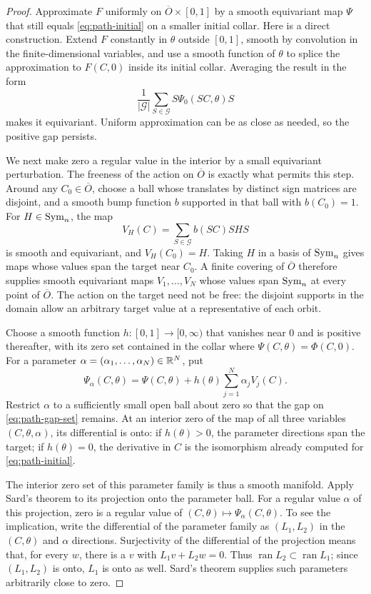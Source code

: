 \begin{proof}
Approximate $F$ uniformly on $\overline O\times[0,1]$ by a smooth
equivariant map $\Psi$ that still equals \eqref{eq:path-initial} on a
smaller initial collar.  Here is a direct construction.  Extend $F$
constantly in $\theta$ outside $[0,1]$, smooth by convolution in the
finite-dimensional variables, and use a smooth function of $\theta$
to splice the approximation to $F(C,0)$ inside its initial collar.
Averaging the result in the form
\[
    \frac1{|\mathcal G|}\sum_{S\in\mathcal G}
       S\Psi_0(SC,\theta)S
\]
makes it equivariant.  Uniform approximation can be as close as
needed, so the positive gap persists.

We next make zero a regular value in the interior by a small
equivariant perturbation.  The freeness of the action on $\overline O$
is exactly what permits this step.  Around any $C_0\in\overline O$,
choose a ball whose translates by distinct sign matrices are disjoint,
and a smooth bump function $b$ supported in that ball with $b(C_0)=1$.
For $H\in\operatorname{Sym}_n$, the map
\[
    V_H(C)=\sum_{S\in\mathcal G} b(SC)SHS
\]
is smooth and equivariant, and $V_H(C_0)=H$.  Taking $H$ in a basis of
$\operatorname{Sym}_n$ gives maps whose values span the target near $C_0$.
A finite covering of $\overline O$ therefore supplies smooth
equivariant maps $V_1,\ldots,V_N$ whose values span $\operatorname{Sym}_n$ at every
point of $\overline O$.  The action on the target need not be free:
the disjoint supports in the domain allow an arbitrary target value
at a representative of each orbit.

Choose a smooth function $h:[0,1]\to[0,\infty)$ that vanishes near
$0$ and is positive thereafter, with its zero set contained in the
collar where $\Psi(C,\theta)=\Phi(C,0)$.  For a parameter
$\alpha=(\alpha_1,\ldots,\alpha_N)\in\mathbb R^N$, put
\[
    \Psi_\alpha(C,\theta)
       =\Psi(C,\theta)+h(\theta)\sum_{j=1}^N\alpha_jV_j(C).
\]
Restrict $\alpha$ to a sufficiently small open ball about zero so that
the gap on \eqref{eq:path-gap-set} remains.  At an interior zero of the
map of all three variables $(C,\theta,\alpha)$, its differential is
onto: if $h(\theta)>0$, the parameter directions span the target;
if $h(\theta)=0$, the derivative in $C$ is the isomorphism already
computed for \eqref{eq:path-initial}.

The interior zero set of this parameter family is thus a smooth
manifold.  Apply Sard's theorem \cite{Sard1942} to its projection onto the parameter
ball.  For a regular value $\alpha$ of this projection, zero is a
regular value of $(C,\theta)\mapsto\Psi_\alpha(C,\theta)$.  To see
the implication, write the differential of the parameter family as
$(L_1,L_2)$ in the $(C,\theta)$ and $\alpha$ directions.  Surjectivity
of the differential of the projection means that, for every $w$,
there is a $v$ with $L_1v+L_2w=0$.  Thus
$\operatorname{ran}L_2\subset\operatorname{ran}L_1$; since
$(L_1,L_2)$ is onto, $L_1$ is onto as well.  Sard's theorem supplies
such parameters arbitrarily close to zero.


\end{proof}
